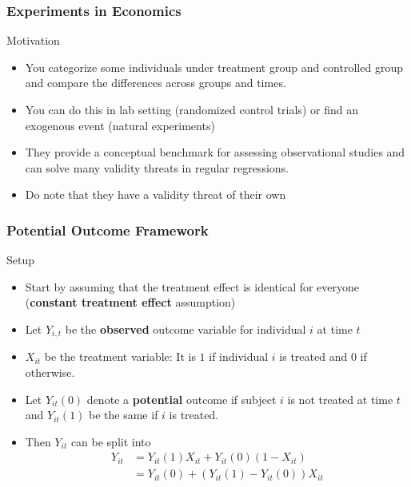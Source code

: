 \documentclass[aspectratio=169]{beamer}
\begin{document}
\begin{frame}
\frametitle{Experiments in Economics}
Motivation
\begin{itemize}
\item You categorize some individuals under treatment group and controlled group and compare the differences across groups and times. 
\item You can do this in lab setting (randomized control trials) or find an exogenous event (natural experiments)
\item They provide a conceptual benchmark for assessing observational studies and can solve many validity threats in regular regressions.
\item Do note that they have a validity threat of their own
\end{itemize}
\end{frame}

\begin{frame}
\frametitle{Potential Outcome Framework}
Setup
\begin{itemize}
\item Start by assuming that the treatment effect is identical for everyone (\textbf{constant treatment effect} assumption)
\item  Let $Y_{i,t}$ be the \textbf{observed} outcome variable for individual $i$ at time $t$
\item  $X_{it}$ be the treatment variable: It is $1$ if individual $i$ is treated and $0$ if otherwise. 
\item Let $Y_{it}(0)$ denote a \textbf{potential} outcome if subject $i$ is not treated at time $t$ and $Y_{it}(1)$ be the same if $i$ is treated. 
\item Then $Y_{it}$ can be split into
\[
\begin{aligned}
Y_{it} & = Y_{it}(1)X_{it}+Y_{it}(0)(1-X_{it})\\
&=Y_{it}(0)+(Y_{it}(1)-Y_{it}(0))X_{it} \\
\end{aligned}
\] 
\end{itemize}
\end{frame}
\end{document}
